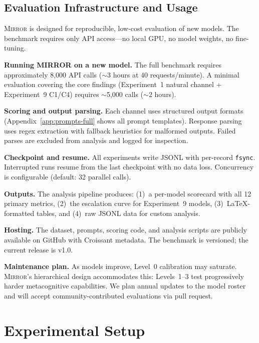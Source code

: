 \documentclass[10pt]{article}
\newcommand{\mirror}{\textsc{Mirror}}
\begin{document}
\subsection{Evaluation Infrastructure and Usage}

\mirror{} is designed for reproducible, low-cost evaluation of new models. The
benchmark requires only API access---no local GPU, no model weights, no fine-tuning.

\textbf{Running MIRROR on a new model.} The full benchmark requires approximately
8,000 API calls ($\sim$3 hours at 40 requests/minute). A minimal evaluation
covering the core findings (Experiment~1 natural channel + Experiment~9 C1/C4)
requires $\sim$5,000 calls ($\sim$2 hours).

\textbf{Scoring and output parsing.} Each channel uses structured output formats
(Appendix~\ref{app:prompts-full} shows all prompt templates). Response parsing uses
regex extraction with fallback heuristics for malformed outputs. Failed parses are
excluded from analysis and logged for inspection.

\textbf{Checkpoint and resume.} All experiments write JSONL with per-record
\texttt{fsync}. Interrupted runs resume from the last checkpoint with no data loss.
Concurrency is configurable (default: 32 parallel calls).

\textbf{Outputs.} The analysis pipeline produces: (1)~a per-model scorecard with
all 12 primary metrics, (2)~the escalation curve for Experiment~9 models,
(3)~LaTeX-formatted tables, and (4)~raw JSONL data for custom analysis.

\textbf{Hosting.} The dataset, prompts, scoring code, and analysis scripts are
publicly available on GitHub with Croissant metadata. The benchmark is versioned;
the current release is v1.0.

\textbf{Maintenance plan.} As models improve, Level~0 calibration may saturate.
\mirror{}'s hierarchical design accommodates this: Levels~1--3 test progressively
harder metacognitive capabilities. We plan annual updates to the model roster and
will accept community-contributed evaluations via pull request.

\section{Experimental Setup}
\label{sec:setup}
\end{document}
